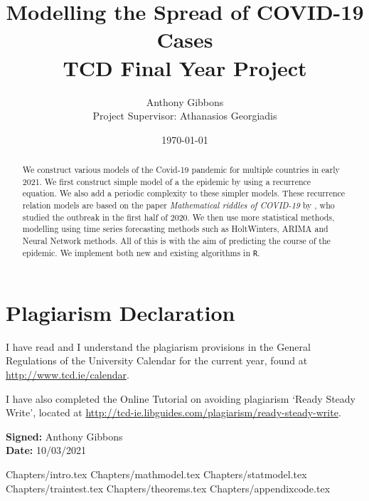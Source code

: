 \documentclass[a4paper]{article}
\title{Modelling the Spread of COVID-19 Cases \\ \large{TCD Final Year Project}}
\author{Anthony Gibbons \\  \normalsize{Project Supervisor: Athanasios Georgiadis}}
\date{\today}
\begin{document}
\maketitle      
\renewcommand\lstlistlistingname{List of Code}

\begin{abstract}
    We construct various models of the Covid-19 pandemic for multiple countries in early 2021. We first construct simple model of a the epidemic by using a recurrence equation. We also add a periodic complexity to these simpler models. These recurrence relation models are based on the paper \textit{Mathematical riddles of COVID-19} by \citeauthor{grigor20} \cite{grigor20}, who studied the outbreak in the first half of 2020. We then use more statistical methods, modelling using time series forecasting methods such as HoltWinters, ARIMA and Neural Network methods. All of this is with the aim of predicting the course of the epidemic. We implement both new and existing algorithms in \verb|R|.
\end{abstract}
\pagebreak
\section*{Plagiarism Declaration}
I have read and I understand the plagiarism provisions in the General
Regulations of the University Calendar for the current year, found at
\url{http://www.tcd.ie/calendar}.

I have also completed the Online Tutorial on avoiding plagiarism
‘Ready Steady Write’, located at
\url{http://tcd-ie.libguides.com/plagiarism/ready-steady-write}.

\textbf{Signed:} Anthony Gibbons \\
\textbf{Date:} 10/03/2021
\pagebreak

\hypersetup{
    linkcolor=black,
}

\tableofcontents \pagebreak

\listoffigures \pagebreak

\lstlistoflistings 

\listoftables \pagebreak

{Chapters/intro.tex}
\pagebreak
{Chapters/mathmodel.tex}
\pagebreak
{Chapters/statmodel.tex}
\pagebreak
{Chapters/traintest.tex}
\pagebreak
\appendix
{Chapters/theorems.tex}
\pagebreak
{Chapters/appendixcode.tex}
\pagebreak 
\printbibliography
\end{document}
